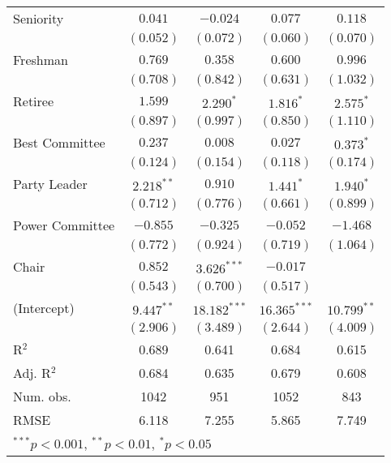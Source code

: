 \documentclass[12pt]{article}
\begin{document}
\begin{table}[H]
\begin{center}
\begin{tabular}{l c c c c }
			Seniority              & $0.041$        & $-0.024$        & $0.077$        & $0.118$       \\
			& $(0.052)$      & $(0.072)$       & $(0.060)$      & $(0.070)$     \\
			Freshman               & $0.769$        & $0.358$         & $0.600$        & $0.996$       \\
			& $(0.708)$      & $(0.842)$       & $(0.631)$      & $(1.032)$     \\
			Retiree                & $1.599$        & $2.290^{*}$     & $1.816^{*}$    & $2.575^{*}$   \\
			& $(0.897)$      & $(0.997)$       & $(0.850)$      & $(1.110)$     \\
			Best Committee        & $0.237$        & $0.008$         & $0.027$        & $0.373^{*}$   \\
			& $(0.124)$      & $(0.154)$       & $(0.118)$      & $(0.174)$     \\
			Party Leader                 & $2.218^{**}$   & $0.910$         & $1.441^{*}$    & $1.940^{*}$   \\
			& $(0.712)$      & $(0.776)$       & $(0.661)$      & $(0.899)$     \\
			Power Committee       & $-0.855$       & $-0.325$        & $-0.052$       & $-1.468$      \\
			& $(0.772)$      & $(0.924)$       & $(0.719)$      & $(1.064)$     \\
			Chair                  & $0.852$        & $3.626^{***}$   & $-0.017$       &               \\
			& $(0.543)$      & $(0.700)$       & $(0.517)$      &               \\
			(Intercept)            & $9.447^{**}$   & $18.182^{***}$  & $16.365^{***}$ & $10.799^{**}$ \\
			& $(2.906)$      & $(3.489)$       & $(2.644)$      & $(4.009)$     \\
			\hline
			R$^2$                  & 0.689          & 0.641           & 0.684          & 0.615         \\
			Adj. R$^2$             & 0.684          & 0.635           & 0.679          & 0.608         \\
			Num. obs.              & 1042           & 951             & 1052           & 843           \\
			RMSE                   & 6.118          & 7.255           & 5.865          & 7.749         \\
			\hline
			\multicolumn{5}{l}{\scriptsize{$^{***}p<0.001$, $^{**}p<0.01$, $^*p<0.05$}}
		\end{tabular}
	\end{center}
\end{table}
\end{document}
